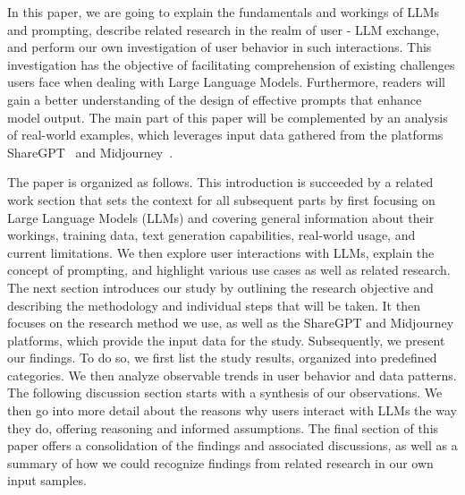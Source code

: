 In this paper, we are going to explain the fundamentals and workings of LLMs and prompting,
describe related research in the realm of user - LLM exchange, and perform our own investigation of
user behavior in such interactions.
This investigation has the objective of facilitating comprehension of existing challenges users
face when dealing with Large Language Models.
Furthermore, readers will gain a better understanding of the design of effective prompts that
enhance model output.
The main part of this paper will be complemented by an analysis of real-world examples, which
leverages input data gathered from the platforms ShareGPT~\cite{sharegpt_sharegpt_2023} and
Midjourney~\cite{midjourney_midjourney_2023}.

The paper is organized as follows.
This introduction is succeeded by a related work section that sets the context for all subsequent
parts by first focusing on Large Language Models (LLMs) and covering general information about
their workings, training data, text generation capabilities, real-world usage, and current limitations.
We then explore user interactions with LLMs, explain the concept of prompting, and highlight
various use cases as well as related research.
%
The next section introduces our study by outlining the research objective and
describing the methodology and individual steps that will be taken.
It then focuses on the research method we use, as well as the ShareGPT and Midjourney platforms,
which provide the input data for the study.
%
Subsequently, we present our findings.
To do so, we first list the study results, organized into predefined categories.
We then analyze observable trends in user behavior and data patterns.
%
The following discussion section starts with a synthesis of our observations.
We then go into more detail about the reasons why users interact with LLMs the way they do,
offering reasoning and informed assumptions.
%
The final section of this paper offers a consolidation of the findings and associated discussions,
as well as a summary of how we could recognize findings from related research in our own input
samples.